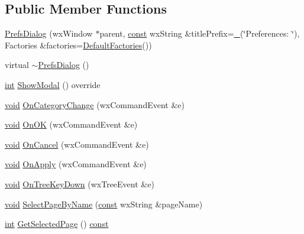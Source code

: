 \subsection*{Public Member Functions}
\begin{DoxyCompactItemize}
\item 
\hyperlink{class_prefs_dialog_aebe135f8ddd9e5a74e1280e6b47d722e}{Prefs\+Dialog} (wx\+Window $\ast$parent, \hyperlink{getopt1_8c_a2c212835823e3c54a8ab6d95c652660e}{const} wx\+String \&title\+Prefix=\hyperlink{vr32_8c_ae4dfd7b0d66121016d6466d2ff10e8ba}{\+\_\+}(\char`\"{}Preferences\+: \char`\"{}), Factories \&factories=\hyperlink{class_prefs_dialog_ac42cda72337d03c90b4cd7951b8e0dcd}{Default\+Factories}())
\item 
virtual \hyperlink{class_prefs_dialog_ad971182376c749c314f0a62a58350520}{$\sim$\+Prefs\+Dialog} ()
\item 
\hyperlink{xmltok_8h_a5a0d4a5641ce434f1d23533f2b2e6653}{int} \hyperlink{class_prefs_dialog_ada786bf98260cc6f72c3aefcadb5aba4}{Show\+Modal} () override
\item 
\hyperlink{sound_8c_ae35f5844602719cf66324f4de2a658b3}{void} \hyperlink{class_prefs_dialog_a63e1a8cee29957d9bbad5f9b5c1b9290}{On\+Category\+Change} (wx\+Command\+Event \&e)
\item 
\hyperlink{sound_8c_ae35f5844602719cf66324f4de2a658b3}{void} \hyperlink{class_prefs_dialog_ac4ca8d6d6248e5906cbd2978a3439580}{On\+OK} (wx\+Command\+Event \&e)
\item 
\hyperlink{sound_8c_ae35f5844602719cf66324f4de2a658b3}{void} \hyperlink{class_prefs_dialog_a74e58cc3d741f284a74eb31321f27a03}{On\+Cancel} (wx\+Command\+Event \&e)
\item 
\hyperlink{sound_8c_ae35f5844602719cf66324f4de2a658b3}{void} \hyperlink{class_prefs_dialog_ac898e82fceed6e645a886f592130310e}{On\+Apply} (wx\+Command\+Event \&e)
\item 
\hyperlink{sound_8c_ae35f5844602719cf66324f4de2a658b3}{void} \hyperlink{class_prefs_dialog_a6a85946fdebf389f280fca1ee7c53f3a}{On\+Tree\+Key\+Down} (wx\+Tree\+Event \&e)
\item 
\hyperlink{sound_8c_ae35f5844602719cf66324f4de2a658b3}{void} \hyperlink{class_prefs_dialog_accdb55518a7d0323175d7b15d3f557d5}{Select\+Page\+By\+Name} (\hyperlink{getopt1_8c_a2c212835823e3c54a8ab6d95c652660e}{const} wx\+String \&page\+Name)
\item 
\hyperlink{xmltok_8h_a5a0d4a5641ce434f1d23533f2b2e6653}{int} \hyperlink{class_prefs_dialog_a570e87d6cdae0d0081a6531fa1e007c0}{Get\+Selected\+Page} () \hyperlink{getopt1_8c_a2c212835823e3c54a8ab6d95c652660e}{const} 
\end{DoxyCompactItemize}
